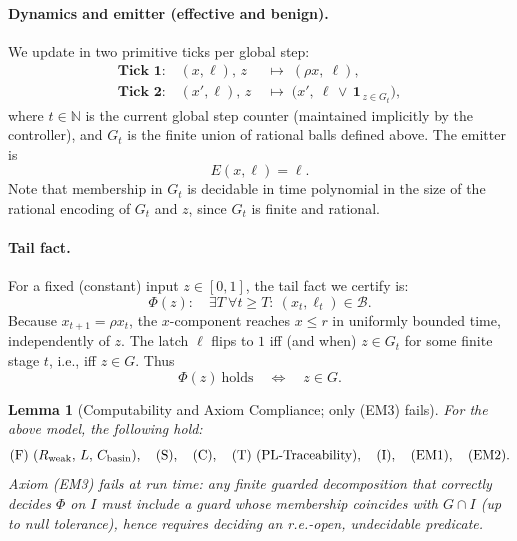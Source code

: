 \documentclass[12pt]{article}
\theoremstyle{definition}
\theoremstyle{plain}
\newtheorem{lemma}{Lemma}[section]
\begin{document}
\paragraph{Dynamics and emitter (effective and benign).}
We update in two primitive ticks per global step:
\begin{align*}
\textbf{Tick 1:}\quad
(x,\ell),\,z \;&\mapsto\; (\rho x,\ \ell),\\
\textbf{Tick 2:}\quad
(x',\ell),\,z \;&\mapsto\; \bigl(x',\ \ell \,\vee\, \mathbf 1_{\,z\in G_t}\bigr),
\end{align*}
where \(t\in\mathbb N\) is the current global step counter (maintained implicitly by the controller),
and \(G_t\) is the finite union of rational balls defined above. The emitter is
\[
E(x,\ell)=\ell.
\]
Note that membership in \(G_t\) is decidable in time polynomial in the size of the rational encoding
of \(G_t\) and \(z\), since \(G_t\) is finite and rational.

\paragraph{Tail fact.}
For a fixed (constant) input \(z\in[0,1]\), the tail fact we certify is:
\[
\Phi(z):\quad \exists T\ \forall t\ge T:\ (x_t,\ell_t)\in\mathcal B.
\]
Because \(x_{t+1}=\rho x_t\), the \(x\)-component reaches \(x\le r\) in uniformly bounded time,
independently of \(z\). The latch \(\ell\) flips to \(1\) iff (and when) \(z\in G_t\) for some finite
stage \(t\), i.e., iff \(z\in G\). Thus
\[
\Phi(z)\ \text{holds} \quad\Longleftrightarrow\quad z\in G.
\]

\begin{lemma}[Computability and Axiom Compliance; only \textup{(EM3)} fails]
\label{lem:EM3-violation-computability}
For the above model, the following hold:
\[
\textup{(F)}\ (R_{\mathrm{weak}},\,L,\,C_{\rm basin}),\quad
\textup{(S)},\quad
\textup{(C)},\quad
\textup{(T)}\ \text{(PL-Traceability)},\quad
\textup{(I)},\quad
\textup{(EM1)},\quad
\textup{(EM2)}.
\]
Axiom \textup{(EM3)} fails at run time: any finite guarded decomposition that correctly decides
\(\Phi\) on \(I\) must include a guard whose membership coincides with \(G\cap I\) (up to null
tolerance), hence requires deciding an r.e.-open, undecidable predicate.
\end{lemma}
\end{document}
